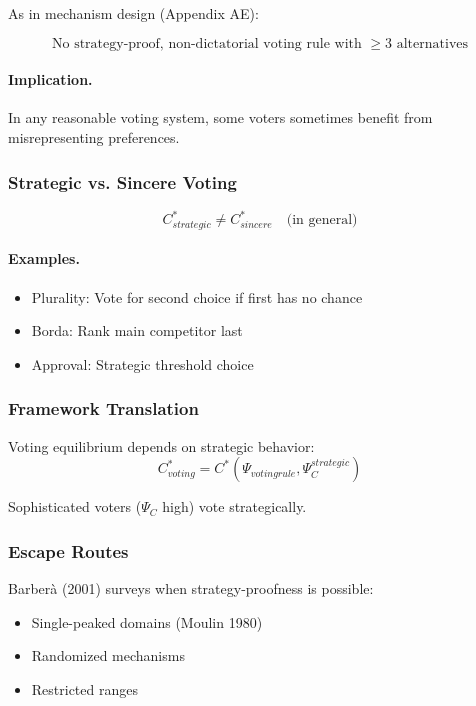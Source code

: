 As in mechanism design (Appendix AE):

\begin{equation}
\boxed{
\text{No strategy-proof, non-dictatorial voting rule with } \geq 3 \text{ alternatives}
}
\label{eq:gs-voting}
\end{equation}

\paragraph{Implication.}
In any reasonable voting system, some voters sometimes benefit from misrepresenting preferences.

\subsubsection{Strategic vs. Sincere Voting}

\begin{equation}
C^*_{strategic} \neq C^*_{sincere} \quad \text{(in general)}
\end{equation}

\paragraph{Examples.}
\begin{itemize}
    \item Plurality: Vote for second choice if first has no chance
    \item Borda: Rank main competitor last
    \item Approval: Strategic threshold choice
\end{itemize}

\subsubsection{Framework Translation}

Voting equilibrium depends on strategic behavior:
\begin{equation}
C^*_{voting} = C^*(\Psi_{voting rule}, \Psi_C^{strategic})
\end{equation}

Sophisticated voters ($\Psi_C$ high) vote strategically.

\subsubsection{Escape Routes}

Barberà (2001) surveys when strategy-proofness is possible:
\begin{itemize}
    \item Single-peaked domains (Moulin 1980)
    \item Randomized mechanisms
    \item Restricted ranges
\end{itemize}

